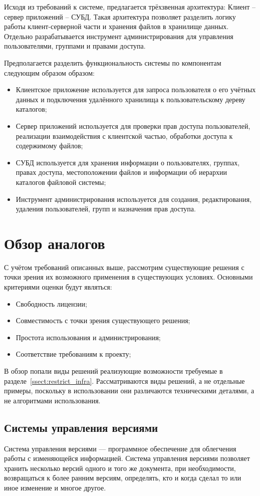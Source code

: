 \documentclass[utf8,usehyperref,12pt]{G7-32}
\begin{document}
Исходя из требований к системе, предлагается трёхзвенная архитектура: Клиент -- сервер приложений -- СУБД. Такая архитектура позволяет разделить логику работы клиент-серверной части и хранения файлов в хранилище данных. Отдельно разрабатывается инструмент администрирования для управления пользователями, группами и правами доступа.

Предполагается разделить функциональность системы по компонентам следующим образом образом:
\begin{itemize}
 \item Клиентское приложение используется для запроса пользователя о его учётных данных и подключения удалённого хранилища к пользовательскому дереву каталогов;
 \item Сервер приложений используется для проверки прав доступа пользователей, реализации взаимодействия с клиентской частью, обработки доступа к содержимому файлов;
 \item СУБД используется для хранения информации о пользователях, группах, правах доступа, местоположении файлов и информации об иерархии каталогов файловой системы;
 \item Инструмент администрирования используется для создания, редактирования, удаления пользователей, групп и назначения прав доступа.
\end{itemize}

\section{Обзор аналогов}\label{sect_analogs}
С учётом требований описанных выше, рассмотрим существующие решения с точки зрения их возможного применения в существующих условиях. Основными критериями оценки будут являться:
\begin{itemize}
 \item Свободность лицензии;
 \item Совместимость с точки зрения существующего решения;
 \item Простота использования и администрирования;
 \item Соответствие требованиям к проекту;
\end{itemize}

В обзор попали виды решений реализующие возможности требуемые в разделе~\ref{ssect:restrict_infra}. Рассматриваются виды решений, а не отдельные примеры, поскольку в использовании они различаются техническими деталями, а не алгоритмами использования.

\subsection{Системы управления версиями}
Система управления версиями — программное обеспечение для облегчения работы с изменяющейся информацией. Система управления версиями позволяет хранить несколько версий одного и того же документа, при необходимости, возвращаться к более ранним версиям, определять, кто и когда сделал то или иное изменение и многое другое.
\end{document}
